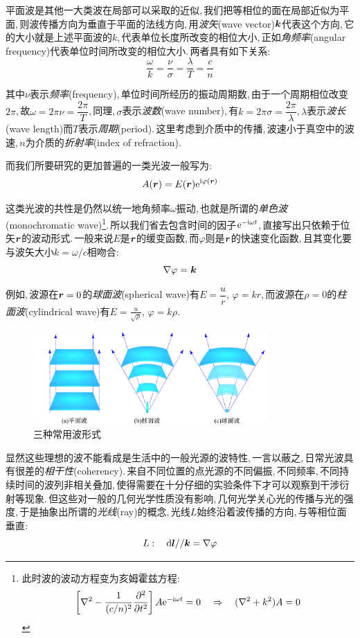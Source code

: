 平面波是其他一大类波在局部可以采取的近似,\,我们把等相位的面在局部近似为平面,\,则波传播方向为垂直于平面的法线方向,\,用\emph{波矢}(wave vector)$\boldsymbol{k}$代表这个方向,\,它的大小就是上述平面波的$k$,\,代表单位长度所改变的相位大小,\,正如\emph{角频率}(angular frequency)代表单位时间所改变的相位大小.\,两者具有如下关系:
\[\frac{\omega}{k}=\frac{\nu}{\sigma}=\frac{\lambda}{T}=\frac{c}{n}\]

其中$\nu$表示\emph{频率}(frequency),\,单位时间所经历的振动周期数,\,由于一个周期相位改变$2\pi$,\,故$\omega=2\pi \nu=\dfrac{2\pi}{T}$,\,同理,\,$\sigma$表示\emph{波数}(wave number),\,有$k=2\pi \sigma=\dfrac{2\pi}{\lambda}$,\,$\lambda$表示\emph{波长}(wave length)而$T$表示\emph{周期}(period).\,这里考虑到介质中的传播,\,波速小于真空中的波速,\,$n$为介质的\emph{折射率}(index of refraction).

而我们所要研究的更加普遍的一类光波一般写为:
\[A(\boldsymbol{r})=E(\boldsymbol{r}){\rm e}^{{\rm i} \varphi(\boldsymbol{r})}\]

这类光波的共性是仍然以统一地角频率$\omega$振动,\,也就是所谓的\emph{单色波}(monochromatic wave)\footnote{此时波的波动方程变为亥姆霍兹方程:\[\left[\nabla^2-\frac{1}{(c/n)^2}\frac{\partial^2}{\partial t^2}\right]A{\rm e}^{-{\rm i} \omega t}=0 \quad \Rightarrow \quad (\nabla^2+k^2)A=0\]}.\,所以我们省去包含时间的因子${\rm e}^{-{\rm i} \omega t}$,\,直接写出只依赖于位矢$\boldsymbol{r}$的波动形式.\,一般来说$E$是$\boldsymbol{r}$的缓变函数,\,而$\varphi$则是$\boldsymbol{r}$的快速变化函数,\,且其变化要与波矢大小$k=\omega/c$相吻合:
\[\nabla \varphi=\boldsymbol{k}\]

例如,\,波源在$\boldsymbol{r}=0$的\emph{球面波}(spherical wave)有$E=\dfrac{u}{r},\,\varphi=kr$,\,而波源在$\rho=0$的\emph{柱面波}(cylindrical wave)有$\displaystyle E=\frac{u}{\sqrt{\rho}},\,\varphi=k\rho$.

\begin{figure}[H]
\centering
\includegraphics[width=0.8\textwidth]{image/5-6-3.png}
\caption{三种常用波形式}
\end{figure}

显然这些理想的波不能看成是生活中的一般光源的波特性,\,一言以蔽之,\,日常光波具有很差的\emph{相干性}(coherency).\,来自不同位置的点光源的不同偏振,\,不同频率,\,不同持续时间的波列非相关叠加,\,使得需要在十分仔细的实验条件下才可以观察到干涉衍射等现象.\,但这些对一般的几何光学性质没有影响,\,几何光学关心光的传播与光的强度,\,于是抽象出所谓的\emph{光线}(ray)的概念,\,光线$L$始终沿着波传播的方向,\,与等相位面垂直:
\[L:\quad \textrm{d} \boldsymbol{l}//\boldsymbol{k}=\nabla \varphi\]

